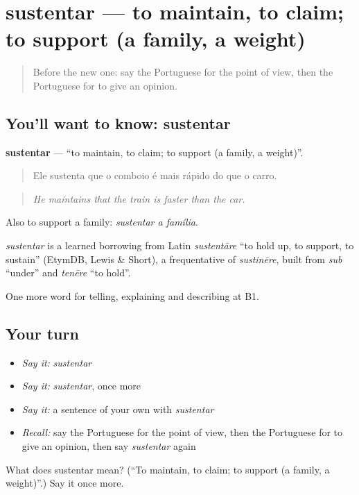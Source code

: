 \section[sustentar]{sustentar — to maintain, to claim; to support (a family, a weight)}

\label{lesson:PT-C335-sustentar}



\begin{quote}
Before the new one: say the Portuguese for the point of view, then the Portuguese for to give an opinion.
\end{quote}

\subsection*{You'll want to know: sustentar}
\textbf{sustentar} — \textquotedblleft{}to maintain, to claim; to support (a family, a weight)\textquotedblright{}.

\begin{quote}
Ele sustenta que o comboio é mais rápido do que o carro.
\end{quote}

\begin{quote}
\emph{He maintains that the train is faster than the car.}
\end{quote}

Also to support a family: \emph{sustentar a família}.

\begin{cousinweb}
\emph{sustentar} is a learned borrowing from Latin \emph{sustentāre} \textquotedblleft{}to hold up, to support, to sustain\textquotedblright{} (EtymDB, Lewis \& Short), a frequentative of \emph{sustinēre}, built from \emph{sub} \textquotedblleft{}under\textquotedblright{} and \emph{tenēre} \textquotedblleft{}to hold\textquotedblright{}.
\end{cousinweb}

\begin{grammarlens}[title={What you've built}]
One more word for telling, explaining and describing at B1.
\end{grammarlens}

\subsection*{Your turn}
\begin{itemize}
\raggedright
  \item \emph{Say it:} \emph{sustentar}
  \item \emph{Say it:} \emph{sustentar}, once more
  \item \emph{Say it:} a sentence of your own with \emph{sustentar}
  \item \emph{Recall:} say the Portuguese for the point of view, then the Portuguese for to give an opinion, then say \emph{sustentar} again
\end{itemize}

\begin{tcolorbox}[breakable,colback=teal!4,colframe=teal!35!black,title={Before you move on}]
What does sustentar mean? (\textquotedblleft{}To maintain, to claim; to support (a family, a weight)\textquotedblright{}.) Say it once more.
\end{tcolorbox}

